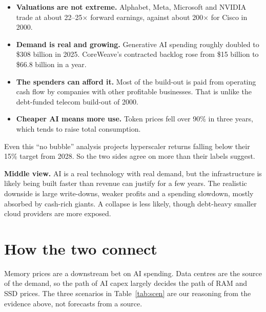 \documentclass[11pt]{article}
\begin{document}
\begin{itemize}
  \item \textbf{Valuations are not extreme.} Alphabet, Meta, Microsoft and NVIDIA trade at about 22--25$\times$ forward earnings, against about 200$\times$ for Cisco in 2000.
  \item \textbf{Demand is real and growing.} Generative AI spending roughly doubled to \$308 billion in 2025. CoreWeave's contracted backlog rose from \$15 billion to \$66.8 billion in a year.
  \item \textbf{The spenders can afford it.} Most of the build-out is paid from operating cash flow by companies with other profitable businesses. That is unlike the debt-funded telecom build-out of 2000.
  \item \textbf{Cheaper AI means more use.} Token prices fell over 90\% in three years, which tends to raise total consumption.
\end{itemize}

Even this ``no bubble'' analysis projects hyperscaler returns falling below their 15\% target from 2028. So the two sides agree on more than their labels suggest.

\begin{accentbox}
\textbf{Middle view.} AI is a real technology with real demand, but the infrastructure is likely being built faster than revenue can justify for a few years. The realistic downside is large write-downs, weaker profits and a spending slowdown, mostly absorbed by cash-rich giants. A collapse is less likely, though debt-heavy smaller cloud providers are more exposed.
\end{accentbox}

\section{How the two connect}

Memory prices are a downstream bet on AI spending. Data centres are the source of the demand, so the path of AI capex largely decides the path of RAM and SSD prices. The three scenarios in Table~\ref{tab:scen} are our reasoning from the evidence above, not forecasts from a source.
\end{document}
